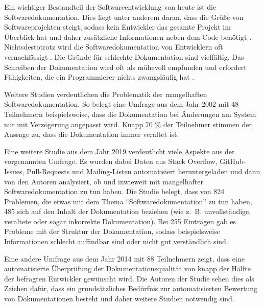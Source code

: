 \label{sec:introduction}

Ein wichtiger Bestandteil der Softwareentwicklung von heute ist die Softwaredokumentation. Dies liegt unter anderem daran, dass die Größe von Softwareprojekten steigt, sodass kein Entwickler das gesamte Projekt im Überblick hat und daher zusätzliche Informationen neben dem Code benötigt \cite[S. 1]{StaticAnalysis:AnIntroduction:TheFundamentalChallengeofSoftwareEngineeringisOneofComplexity.}. Nichtsdestotrotz wird die Softwaredokumentation von Entwicklern oft vernachlässigt \cite[S. 83]{Qualityanalysisofsourcecodecomments}.  Die Gründe für schlechte Dokumentation sind vielfältig. Das Schreiben der Dokumentation wird oft als mühevoll empfunden und erfordert Fähigkeiten, die ein Programmierer nichts zwangsläufig hat \cite[S. 70]{AutomaticQualityAssessmentofSourceCodeComments:TheJavadocMiner} \cite[S. 593]{Softwareengineeringandsoftwaredocumentation:aunifiedlongcourse}.  

Weitere Studien verdeutlichen die Problematik der mangelhaften Softwaredokumentation. So belegt eine Umfrage aus dem Jahr 2002 mit 48 Teilnehmern  beispielsweise, dass die Dokumentation  bei Änderungen am System  nur mit Verzögerung angepasst wird. Knapp 70 \% der Teilnehmer stimmen der Aussage zu, dass die Dokumentation immer veraltet ist.   \cite[S. 28-29]{TheRelevanceofSoftwareDocumentationToolsandTechnologies:ASurvey}

Eine weitere Studie  \cite[S.1199-1208]{SoftwareDocumentationIssuesUnveiled} aus dem Jahr 2019 verdeutlicht viele Aspekte aus der vorgenannten Umfrage. Es wurden dabei Daten aus Stack Overflow, GitHub-Issues, Pull-Requests und Mailing-Listen automatisiert heruntergeladen und dann von den Autoren analysiert, ob und inwieweit mit mangelhafter Softwaredokumentation zu tun haben.  Die Studie belegt, dass von 824 Problemen, die etwas mit dem Thema \enquote{Softwaredokumentation} zu tun haben, 485 sich auf den Inhalt der Dokumentation beziehen (wie z.~B. unvollständige, veraltete oder sogar inkorrekte Dokumentation). Bei 255 Einträgen gab es Probleme mit der Struktur der Dokumentation, sodass beispielsweise Informationen schlecht auffindbar sind oder nicht gut verständlich sind.


Eine andere Umfrage aus dem Jahr 2014 mit 88 Teilnehmern zeigt, dass eine automatisierte Überprüfung der Dokumentationsqualität von knapp der Hälfte der befragten Entwickler gewünscht wird. Die Autoren der Studie sehen dies als Zeichen dafür, dass ein grundsätzliches Bedürfnis zur automatisierten Bewertung von Dokumentationen besteht und daher weitere Studien notwendig sind. \cite[S. 340]{TheValueofSoftwareDocumentationQuality}

